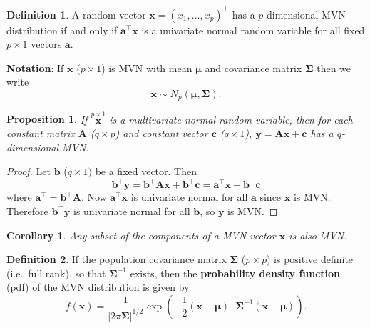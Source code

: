 \documentclass[]{book}
\newtheorem{corollary}{Corollary}[chapter]
\newtheorem{proposition}{Proposition}[chapter]
\theoremstyle{definition}
\newtheorem{definition}{Definition}[chapter]
\theoremstyle{definition}
\theoremstyle{definition}
\theoremstyle{remark}
\begin{document}
\begin{definition}
\protect\hypertarget{def:mvn}{}{\label{def:mvn} }A random vector \(\boldsymbol x=(x_1, \ldots , x_p)^\top\) has a \(p\)-dimensional MVN distribution if and only if \(\boldsymbol a^\top \boldsymbol x\) is a univariate normal random variable for all fixed \(p \times 1\) vectors \(\boldsymbol a\).
\end{definition}

\textbf{Notation}: \quad If \(\boldsymbol x\) (\(p \times 1\)) is MVN with mean \(\boldsymbol \mu\) and covariance matrix \(\boldsymbol \Sigma\) then we write
\[ \boldsymbol x\sim N_p (\boldsymbol \mu, \boldsymbol \Sigma).\]

\begin{proposition}
\protect\hypertarget{prp:six1}{}{\label{prp:six1} }If \(\stackrel{p \times 1}{\boldsymbol x}\) is a multivariate normal random variable, then for each constant matrix \(\boldsymbol A\) (\(q \times p\)) and constant vector \(\boldsymbol c\) (\(q \times 1\)), \(\boldsymbol y= \boldsymbol A\boldsymbol x+ \boldsymbol c\) has a \(q\)-dimensional MVN.
\end{proposition}

\begin{proof}
{}Let \(\boldsymbol b\) (\(q \times 1)\) be a fixed vector. Then
\[ \boldsymbol b^\top \boldsymbol y= \boldsymbol b^\top \boldsymbol A\boldsymbol x+ \boldsymbol b^\top \boldsymbol c= \boldsymbol a^\top \boldsymbol x+ \boldsymbol b^\top \boldsymbol c\]
where \(\boldsymbol a^\top = \boldsymbol b^\top \boldsymbol A\). Now \(\boldsymbol a^\top \boldsymbol x\) is univariate normal for all \(\boldsymbol a\) since \(\boldsymbol x\) is MVN. Therefore \(\boldsymbol b^\top \boldsymbol y\) is univariate normal for all \(\boldsymbol b\), so \(\boldsymbol y\) is MVN.
\end{proof}

\begin{corollary}
\protect\hypertarget{cor:csix1}{}{\label{cor:csix1} }Any subset of the components of a MVN vector \(\boldsymbol x\) is also MVN.
\end{corollary}

\begin{definition}
\protect\hypertarget{def:mvnpdf}{}{\label{def:mvnpdf} }If the population covariance matrix \(\boldsymbol \Sigma\) (\(p \times p\)) is positive definite (i.e.~full rank), so that \(\boldsymbol \Sigma^{-1}\) exists,
then the \textbf{probability density function} (pdf) of the MVN distribution is given by
\[ f(\boldsymbol x) = \frac{1}{| 2 \pi \boldsymbol \Sigma|^{1/2}} \exp \left(-\frac{1}{2}(\boldsymbol x- \boldsymbol \mu)^\top \boldsymbol \Sigma^{-1} (\boldsymbol x- \boldsymbol \mu) \right).\]
\end{definition}
\end{document}
